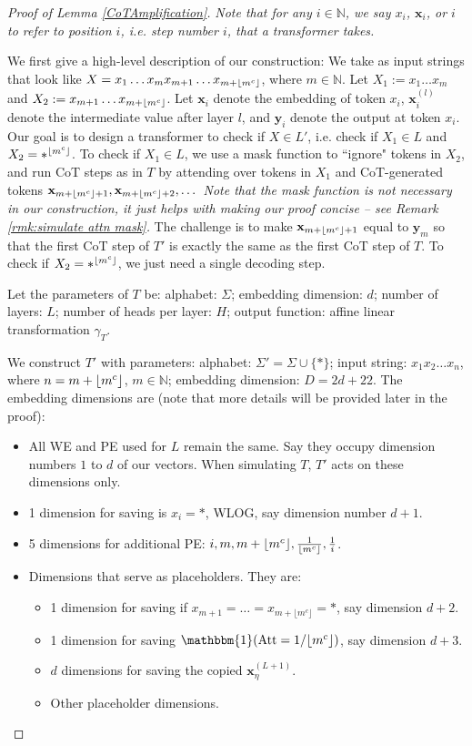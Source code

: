 \documentclass{article}
\theoremstyle{definition}
\DeclarePairedDelimiter{\floor}{\lfloor}{\rfloor}
\newcommand{\N}{\mathbb{N}}
\newcommand{\x}{\mathbf{x}}
\newcommand{\y}{\mathbf{y}}
\newcommand{\0}{\mathbf{0}}
\newcommand{\1}{\mathbbm{1}}
\newcommand{\Att}{\text{Att}}
\begin{document}
\begin{proof}[Proof of Lemma \ref{CoTAmplification}]
\textit{Note that for any $i \in \N$, we say $x_i$, $\x_i$, or $i$ to refer to position $i$, i.e. step number $i$, that a transformer takes.}
    
We first give a high-level description of our construction: We take as input strings that look like $X = x_1 \dots x_m x_{m+1} \dots x_{m+\floor{m^c}}$, where $m \in \N$. Let $X_1 := x_1 \dots x_m$ and $X_2 := x_{m+1} \dots x_{m+\floor{m^c}}$. Let $\x_i$ denote the embedding of token $x_i$, $\x_i^{(l)}$ denote the intermediate value after layer $l$, and $\y_i$ denote the output at token $x_i$. Our goal is to design a transformer to check if $X \in L'$, i.e. check if $X_1 \in L$ and $X_2 = *^{\floor{m^c}}$. To check if $X_1 \in L$, we use a mask function to ``ignore" tokens in $X_2$, and run CoT steps as in $T$ by attending over tokens in $X_1$ and CoT-generated tokens $\x_{m + \floor{m^c} + 1}, \x_{m + \floor{m^c} + 2}, \dots$ \textit{Note that the mask function is not necessary in our construction, it just helps with making our proof concise -- see Remark \ref{rmk:simulate attn mask}.} The challenge is to make $\x_{m + \floor{m^c} + 1}$ equal to $\y_{m}$ so that the first CoT step of $T'$ is exactly the same as the first CoT step of $T$. To check if $X_2 = *^{\floor{m^c}}$, we just need a single decoding step.  

Let the parameters of $T$ be: alphabet: $\Sigma$; embedding dimension: $d$; number of layers: $L$; number of heads per layer: $H$; output function: affine linear transformation $\gamma_T$. 

We construct $T'$ with parameters: alphabet: $\Sigma' = \Sigma \cup \{*\}$; input string: $x_1 x_2 \dots x_{n}$, where $n = m + \floor{m^c}$, $m \in \N$; embedding dimension: $D = 2d + 22$. The embedding dimensions are (note that more details will be provided later in the proof): 
\begin{itemize}[noitemsep,leftmargin=10pt]
    \item All WE and PE used for $L$ remain the same. Say they occupy dimension numbers $1$ to $d$ of our vectors. When simulating $T$, $T'$ acts on these dimensions only. 
    \item 1 dimension for saving is $x_i = *$, WLOG, say dimension number $d+1$. 
    \item 5 dimensions for additional PE: $i, m, m+\floor{m^c}, \frac{1}{\floor{m^c}}, \frac{1}{i}$. 
    \item Dimensions that serve as placeholders. They are: 
    \begin{itemize}[noitemsep,leftmargin=10pt]
        \item 1 dimension for saving if $x_{m+1} = \dots = x_{m + \lfloor m^c\rfloor} = *$, say dimension $d+2$.
        \item 1 dimension for saving $\1(\Att = 1/\floor{m^c})$, say dimension $d+3$.
        \item $d$ dimensions for saving the copied $\x_\eta^{(L+1)}$.
        \item Other placeholder dimensions.
    \end{itemize}
\end{itemize} 



\end{proof}
\end{document}
